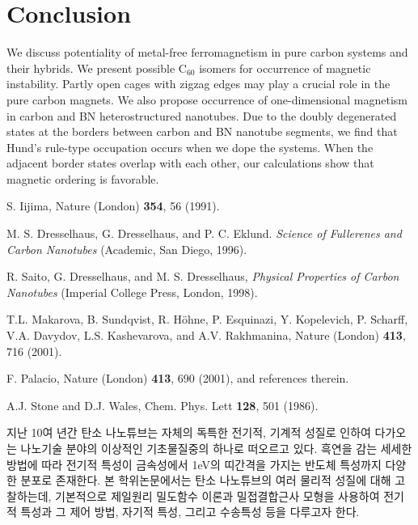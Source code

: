 \documentclass[doctor,english,final]{kaist-ucs}
\begin{document}
\chapter{Conclusion}

We discuss potentiality of metal-free ferromagnetism
in pure carbon systems and their hybrids.
We present possible C$_{60}$ isomers for occurrence of magnetic
instability.
Partly open cages with zigzag edges may play a crucial role in
the pure carbon magnets.
We also propose occurrence of one-dimensional magnetism in carbon and
BN heterostructured nanotubes.
Due to the doubly degenerated states at the borders between
carbon and BN nanotube segments, we find that Hund's rule-type
occupation occurs when we dope the systems.
When the adjacent border states overlap with each other,
our calculations show that magnetic ordering is favorable.

\begin{thebibliography}{00}

 S. Iijima,
         Nature (London) {\bf 354}, 56 (1991).

 M. S. Dresselhaus, G. Dresselhaus, and P. C. Eklund.
         {\em Science of Fullerenes and Carbon Nanotubes} (Academic, San Diego, 1996).

 R. Saito, G. Dresselhaus, and M. S. Dresselhaus,
         {\em Physical Properties of Carbon Nanotubes}
         (Imperial College Press, London, 1998).

 T.L. Makarova, B. Sundqvist,
         R. H\"ohne, P. Esquinazi, Y. Kopelevich, P. Scharff,
         V.A. Davydov, L.S. Kashevarova, and A.V. Rakhmanina,
         Nature (London) {\bf 413}, 716 (2001).

 F. Palacio, Nature (London) {\bf 413}, 690 (2001),
         and references therein.

 A.J. Stone and D.J. Wales,
         Chem. Phys. Lett {\bf 128}, 501 (1986).

\end{thebibliography}

\begin{summary}

    지난 10여 년간 탄소 나노튜브는 자체의 독특한 전기적, 기계적 성질로
    인하여 다가오는 나노기술 분야의 이상적인 기초물질중의 하나로 떠오르고
    있다. 흑연을 감는 세세한 방법에 따라 전기적 특성이 금속성에서 1eV의
    띠간격을 가지는 반도체 특성까지 다양한 분포로 존재한다.
    본 학위논문에서는 탄소 나노튜브의 여러 물리적 성질에 대해 고찰하는데,
    기본적으로 제일원리 밀도함수 이론과 밀접결합근사 모형을 사용하여 전기적
    특성과 그 제어 방법, 자기적 특성, 그리고 수송특성 등을 다루고자 한다.

\end{summary}
\end{document}
